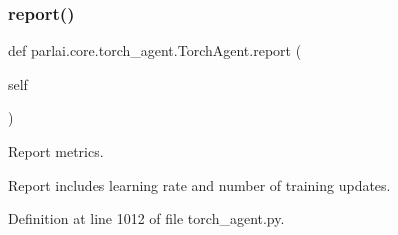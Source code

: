 \mbox{\label{classparlai_1_1core_1_1torch__agent_1_1TorchAgent_ac694770cd4022eb047bf6fbb8f46035c}} 
\subsubsection{\texorpdfstring{report()}{report()}}
{\footnotesize\ttfamily def parlai.\+core.\+torch\+\_\+agent.\+Torch\+Agent.\+report (\begin{DoxyParamCaption}\item[{}]{self }\end{DoxyParamCaption})}

\begin{DoxyVerb}Report metrics.

Report includes learning rate and number of training updates.
\end{DoxyVerb}
 

Definition at line 1012 of file torch\+\_\+agent.\+py.


